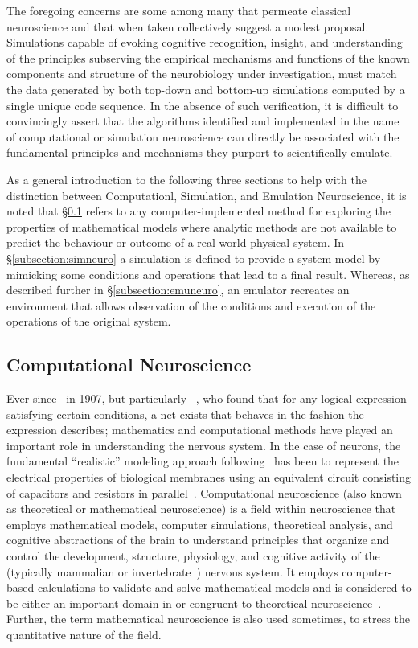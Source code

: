 \documentclass[11pt,3p,twocolumn]{JMN}
\begin{document}
The foregoing concerns are some among many that permeate classical neuroscience and that when taken collectively suggest a modest proposal. Simulations capable of evoking cognitive recognition, insight, and understanding of the principles subserving the empirical mechanisms and functions of the known components and structure of the neurobiology under investigation, must match the data generated by both top-down and bottom-up simulations computed by a single unique code sequence. In the absence of such verification, it is difficult to convincingly assert that the algorithms identified and implemented in the name of computational or simulation neuroscience can directly be associated with the fundamental principles and mechanisms they purport to scientifically emulate.

As a general introduction to the following three sections to help with the distinction between Computationl, Simulation, and Emulation Neuroscience, it is noted that \S\ref{subsection:compneuro} refers to any computer-implemented method for exploring the properties of mathematical models where analytic methods are not available to predict the behaviour or outcome of a real-world physical system. In \S\ref{subsection:simneuro} a simulation is defined to provide a system model by mimicking some conditions and operations that lead to a final result. Whereas, as described further in \S\ref{subsection:emuneuro}, an emulator recreates an environment that allows observation of the conditions and execution of the operations of the original system.

\subsection{Computational Neuroscience}
\label{subsection:compneuro}

Ever since~\citet{lapicque07} in 1907, but particularly ~\citet{mcculloch43}, who found that for any logical expression satisfying certain conditions, a net exists that behaves in the fashion the expression describes; mathematics and computational methods have played an important role in understanding the nervous system. In the case of neurons, the fundamental ``realistic'' modeling approach following~\citet{hodgkin52e} has been to represent the electrical properties of biological membranes using an equivalent circuit consisting of capacitors and resistors in parallel~\citep[more recently, see][]{bedard13}. Computational neuroscience (also known as theoretical or mathematical neuroscience) is a field within neuroscience that employs mathematical models, computer simulations, theoretical analysis, and cognitive abstractions of the brain to understand principles that organize and control the development, structure, physiology, and cognitive activity of the (typically mammalian or invertebrate~\cite[for example,][]{}) nervous system. It employs computer-based calculations to validate and solve mathematical models and is considered to be either an important domain in or congruent to theoretical neuroscience~\citep{trappenberg23}. Further, the term mathematical neuroscience is also used sometimes, to stress the quantitative nature of the field.
\end{document}
